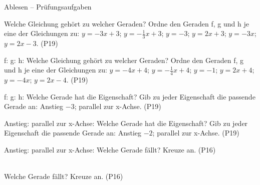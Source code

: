 \begin{aufgabe}{Ablesen – Prüfungsaufgaben}
\begin{teile}
\teil Welche Gleichung gehört zu welcher Geraden? Ordne den Geraden f, g und h je eine der Gleichungen zu: $y = -3x + 3$; $y = -\frac{1}{3}x + 3$; $y = -3$; $y = 2x + 3$; $y = -3x$; $y = 2x - 3$. \hfill (P19) \\

\begin{ksys}[xmin=-5,xmax=5,ymin=-5,ymax=5,ablesen]    \end{ksys}
f: \leerfeld \quad g: \leerfeld \quad h: \leerfeld
\teil Welche Gleichung gehört zu welcher Geraden? Ordne den Geraden f, g und h je eine der Gleichungen zu: $y = -4x + 4$; $y = -\frac{1}{4}x + 4$; $y = -1$; $y = 2x + 4$; $y = -4x$; $y = 2x - 4$. \hfill (P19) \\

\begin{ksys}[xmin=-5,xmax=5,ymin=-5,ymax=5,ablesen]    \end{ksys}
f: \leerfeld \quad g: \leerfeld \quad h: \leerfeld
\teil Welche Gerade hat die Eigenschaft? Gib zu jeder Eigenschaft die passende Gerade an: Anstieg $-3$; parallel zur x-Achse. \hfill (P19) \\

\begin{ksys}[xmin=-5,xmax=5,ymin=-5,ymax=5,ablesen]    \end{ksys}
Anstieg: \leerfeld \quad parallel zur x-Achse: \leerfeld
\teil Welche Gerade hat die Eigenschaft? Gib zu jeder Eigenschaft die passende Gerade an: Anstieg $-2$; parallel zur x-Achse. \hfill (P19) \\

\begin{ksys}[xmin=-5,xmax=5,ymin=-5,ymax=5,ablesen]    \end{ksys}
Anstieg: \leerfeld \quad parallel zur x-Achse: \leerfeld
\teil Welche Gerade fällt? Kreuze an. \hfill (P16) \\  \\ 

\begin{ksys}[xmin=-5,xmax=5,ymin=-5,ymax=5,ablesen]   \end{ksys}
\teil Welche Gerade fällt? Kreuze an. \hfill (P16) \\  \\ 


\end{teile}
\end{aufgabe}
